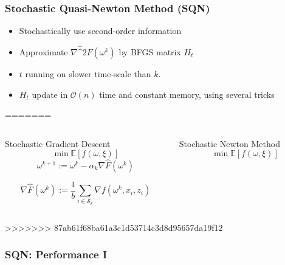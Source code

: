 \documentclass[10pt]{beamer}
\begin{document}
  \begin{frame}\frametitle{Stochastic Quasi-Newton Method (SQN)}
      \begin{itemize}
        \item \alert{Stochastically} use second-order information
        \item Approximate $\nabla \hat^2 F(\omega^{k})$ by BFGS matrix $H_t$
        \item $t$ running on slower time-scale than $k$. 
        \item $H_t$ update in $\mathcal O(n)$ time and constant memory, using several tricks
      \end{itemize}
=======
  	\begin{columns}[T]
  		\begin{column}{.5\textwidth}
  			\centering \alert{Stochastic Gradient Descent}
  			$$\min \mathbb E \left [f(\omega, \xi)\right]$$
  				$$\omega^{k+1}:= \omega^{k}-\alpha_k \nabla \hat F(\omega^{k}) $$
  				
  				$$\nabla \hat F(\omega^{k}) := \frac{1}{b}\sum_{i\in \mathcal S_k}\nabla f(\omega^k, x_i, z_i)$$

  		\end{column}\hfill
  		\begin{column}{.5\textwidth}
  			\centering \alert{Stochastic Newton Method}
  			$$\min \mathbb E \left [f(\omega, \xi)\right]$$
  		\end{column}
  	\end{columns}
>>>>>>> 87ab61f68ba61a3c1d53714c3d8d95657da19f12
  \end{frame}


  \begin{frame}
    \frametitle{SQN: Performance I}

      \begin{columns}[T]
      \begin{column}{.5\textwidth}
        \resizebox{\linewidth}{!}{}
      \end{column}\hfill
      \begin{column}{.5\textwidth}
        \resizebox{\linewidth}{!}{}
      \end{column}
    \end{columns}
  \end{frame}
\end{document}

